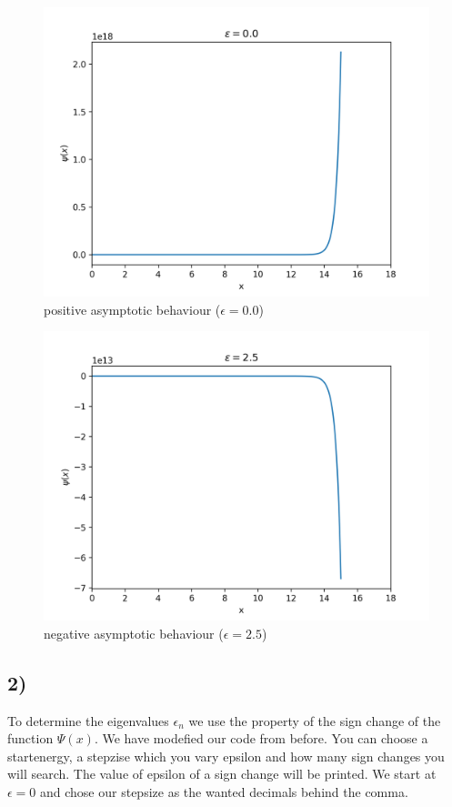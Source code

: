 \documentclass[11pt, a4paper, reqno]{scrartcl}
\begin{document}
    		
    		\begin{figure}[H]
    			\includegraphics[width=.5\paperwidth]{plot_0_0.png}
    			\caption{positive asymptotic behaviour ($\epsilon = 0.0$)}
    		\end{figure}
    		
    		\begin{figure}[H]
    			\includegraphics[width=.5\paperwidth]{plot_2_5.png}
    			\caption{negative asymptotic behaviour ($\epsilon = 2.5$)}
    		\end{figure}
    
    		
    		
    	\subsection*{2)}
    	To determine the eigenvalues $\epsilon_n$ we use the property of the sign 			change of the function $\Psi (x)$. We have modefied our code from before. 			You can choose a startenergy, a stepzise which you vary epsilon and how 			many sign changes you will search. The value of epsilon of a sign change 			will be printed. We start at $\epsilon = 0$ and chose our stepsize as the 			wanted decimals behind the comma.
    		
\end{document}
